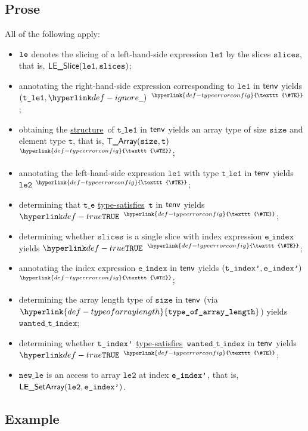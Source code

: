 \documentclass{book}
\newcommand\TypeErrorConfig[0]{\hyperlink{def-typeerrorconfig}{\texttt{\#TE}}}
\newcommand\ProseOrTypeError[0]{\hyperlink{def-proseortypeerror}{$^{\TypeErrorConfig}$}}
\newcommand\structure[0]{\hyperlink{def-structure}{structure}}
\newcommand\typesatisfies[0]{\hyperlink{def-typesatisfies}{type-satisfies}}
\newcommand\typeofarraylength[0]{\hyperlink{def-typeofarraylength}{\texttt{type\_of\_array\_length}}}
\newcommand\vt[0]{\texttt{t}}
\newcommand\vte[0]{\texttt{t\_e}}
\newcommand\vleone[0]{\texttt{le1}}
\newcommand\vletwo[0]{\texttt{le2}}
\newcommand\vtleone[0]{\texttt{t\_le1}}
\newcommand\size[0]{\texttt{size}}
\newcommand\newle[0]{\texttt{new\_le}}
\newcommand\eindex[0]{\texttt{e\_index}}
\newcommand\wantedtindex[0]{\texttt{wanted\_t\_index}}
\newcommand\slices[0]{\texttt{slices}}
\begin{document}
\subsection{Prose}
All of the following apply:
\begin{itemize}
  \item $\texttt{le}$ denotes the slicing of a left-hand-side expression $\vleone$ by the slices $\slices$, that is, $\LESlice(\vleone, \slices)$;
  \item annotating the right-hand-side expression corresponding to $\vleone$ in $\textsf{tenv}$ yields \\ $(\vtleone, \Ignore)$ \ProseOrTypeError;
  \item obtaining the \structure\ of $\vtleone$ in $\textsf{tenv}$ yields an array type of size $\size$ and element type $\vt$, that is, $\TArray(\size, \vt)$ \ProseOrTypeError;
  \item annotating the left-hand-side expression $\vleone$ with type $\vtleone$ in $\textsf{tenv}$ yields $\vletwo$ \ProseOrTypeError;
  \item determining that $\vte$ \typesatisfies\ $\vt$ in $\textsf{tenv}$ yields $\True$ \ProseOrTypeError;
  \item determining whether $\slices$ is a single slice with index expression $\eindex$ yields $\True$ \ProseOrTypeError;
  \item annotating the index expression $\eindex$ in $\textsf{tenv}$ yields $(\texttt{t\_index'}, \texttt{e\_index'})$ \ProseOrTypeError;
  \item determining the array length type of $\size$ in $\textsf{tenv}$ (via $\typeofarraylength$) yields $\wantedtindex$;
  \item determining whether $\texttt{t\_index'}$ \typesatisfies\ $\wantedtindex$ in $\textsf{tenv}$ yields $\True$ \ProseOrTypeError;
  \item $\newle$ is an access to array $\vletwo$ at index $\texttt{e\_index'}$, that is, \\ $\LESetArray(\vletwo, \eindexp)$.
\end{itemize}

\subsection{Example}

\end{document}
